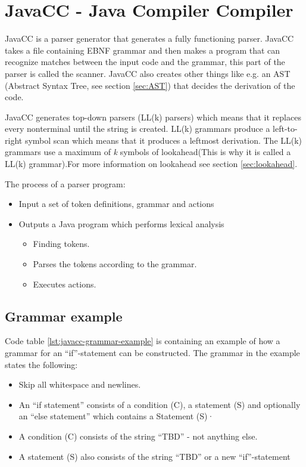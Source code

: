 \chapter{JavaCC - Java Compiler Compiler}
JavaCC is a parser generator that generates a fully functioning parser. JavaCC takes a file containing EBNF grammar and then makes a program that can recognize matches between the input code and the grammar, this part of the parser is called the scanner. JavaCC also creates other things like e.g. an AST (Abstract Syntax Tree, see section \ref{sec:AST}) that decides the derivation of the code. \cite{JavaCC}

JavaCC generates top-down parsers (LL(k) parsers) which means that it replaces every nonterminal until the string is created. LL(k) grammars produce a left-to-right symbol scan which means that it produces a leftmost derivation. The LL(k) grammars use a maximum of \textit{k} symbols of lookahead(This is why it is called a LL(k) grammar).For more information on lookahead see section \ref{sec:lookahead}. \cite{javacc-wustl-ppt}

The process of a parser program:
\begin{itemize}
\item Input a set of token definitions, grammar and actions
\item Outputs a Java program which performs lexical analysis
	\begin{itemize}
	\item Finding tokens.
	\item Parses the tokens according to the grammar.
	\item Executes actions.
	\end{itemize}
\end{itemize}


\section{Grammar example}
Code table \ref{lst:javacc-grammar-example} is containing an example of how a grammar for an ``if''-statement can be constructed. The grammar in the example states the following:

\begin{itemize}
	\item Skip all whitespace and newlines.
	\item An ``if statement'' consists of a condition (C), a statement (S)  and optionally an ``else statement'' which contains a Statement (S)·
	\item A condition (C) consists of the string ``TBD'' - not anything else.
	\item A statement (S) also consists of the string ``TBD'' or a new ``if''-statement
\end{itemize}

